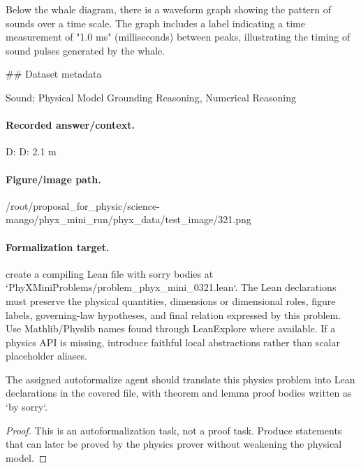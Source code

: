 Below the whale diagram, there is a waveform graph showing the pattern of sounds over a time scale. The graph includes a label indicating a time measurement of "1.0 ms" (milliseconds) between peaks, illustrating the timing of sound pulses generated by the whale.

\#\# Dataset metadata

Sound; Physical Model Grounding Reasoning, Numerical Reasoning

\paragraph{Recorded answer/context.}
D: D: 2.1 m

\paragraph{Figure/image path.}
/root/proposal\_for\_physic/science-mango/phyx\_mini\_run/phyx\_data/test\_image/321.png

\paragraph{Formalization target.}
create a compiling Lean file with sorry bodies at `PhyXMiniProblems/problem\_phyx\_mini\_0321.lean`. The Lean declarations must preserve the physical quantities, dimensions or dimensional roles, figure labels, governing-law hypotheses, and final relation expressed by this problem.
Use Mathlib/Physlib names found through LeanExplore where available. If a physics API is missing, introduce faithful local abstractions rather than scalar placeholder aliases.

\begin{theorem}
\label{thm:physics:phyx_mini_0321:target}
The assigned autoformalize agent should translate this physics problem into Lean declarations in the covered file, with theorem and lemma proof bodies written as `by sorry`.
\end{theorem}
\begin{proof}
This is an autoformalization task, not a proof task. Produce statements that can later be proved by the physics prover without weakening the physical model.
\end{proof}

